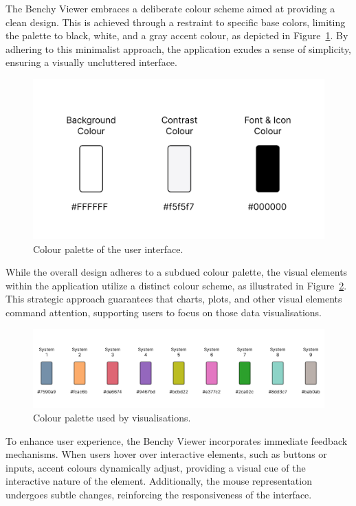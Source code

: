The Benchy Viewer embraces a deliberate colour scheme aimed at providing a clean design. This is achieved through a restraint to specific base colors, limiting the palette to black, white, and a gray accent colour, as depicted in Figure~\ref{fig:colors}. By adhering to this minimalist approach, the application exudes a sense of simplicity, ensuring a visually uncluttered interface.



\begin{figure}[h]
  \centering
  \includegraphics[width=0.5\linewidth]{figures/colors.png}
  \caption{Colour palette of the user interface.}
  \label{fig:colors}
\end{figure}

While the overall design adheres to a subdued colour palette, the visual elements within the application utilize a distinct colour scheme, as illustrated in Figure~\ref{fig:colors-dbms}. This strategic approach guarantees that charts, plots, and other visual elements command attention, supporting users to focus on those data visualisations.

\begin{figure}[h]
  \centering
  \includegraphics[width=1\linewidth]{figures/colors-dbms.png}
  \caption{Colour palette used by visualisations.}
  \label{fig:colors-dbms}
\end{figure}

To enhance user experience, the Benchy Viewer incorporates immediate feedback mechanisms. When users hover over interactive elements, such as buttons or inputs, accent colours dynamically adjust, providing a visual cue of the interactive nature of the element. Additionally, the mouse representation undergoes subtle changes, reinforcing the responsiveness of the interface.


